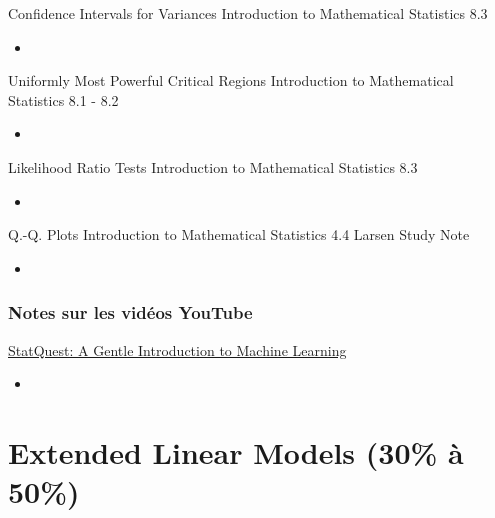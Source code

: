 \documentclass[12pt, titlepage, french]{report}
\begin{document}
\begin{CHPT_SUMM_AUTO_NUMB}[label = {L.-38}]{Confidence Intervals for Variances}
Introduction to Mathematical Statistics 8.3
	\begin{itemize}
		\item	
	\end{itemize}
\end{CHPT_SUMM_AUTO_NUMB}

\begin{CHPT_SUMM_AUTO_NUMB}[label = {L.-39}]{Uniformly Most Powerful Critical Regions}
Introduction to Mathematical Statistics 8.1 - 8.2
	\begin{itemize}
		\item	
	\end{itemize}
\end{CHPT_SUMM_AUTO_NUMB}

\begin{CHPT_SUMM_AUTO_NUMB}[label = {L.-40}]{Likelihood Ratio Tests}
Introduction to Mathematical Statistics 8.3
	\begin{itemize}
		\item	
	\end{itemize}
\end{CHPT_SUMM_AUTO_NUMB}

\begin{CHPT_SUMM_AUTO_NUMB}[label = {L.-41}]{Q.-Q. Plots}
Introduction to Mathematical Statistics 4.4
Larsen Study Note
	\begin{itemize}
		\item	
	\end{itemize}
\end{CHPT_SUMM_AUTO_NUMB}

\subsection{Notes sur les vidéos YouTube}

\begin{YTB_SUMM}[label = {SQ-BASICS-ML-INTRO}]{\href{https://www.youtube.com/watch?v=Gv9_4yMHFhI&list=PLblh5JKOoLUICTaGLRoHQDuF_7q2GfuJF&index=2&t=0s}{StatQuest: A Gentle Introduction to Machine Learning}}
\begin{itemize}
	\item	
\end{itemize}
\end{YTB_SUMM}

\newpage

\chapter[Extended Linear Models]{Extended Linear Models (30\% à 50\%)}
\end{document}
